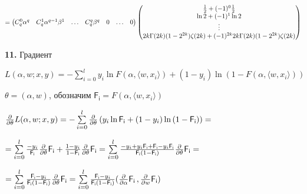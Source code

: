 \documentclass[a4paper,12pt]{article}
\begin{document}
\begin{displaymath}
    = \begin{pmatrix}
        C_q^0 \alpha^q & C_q^1 \alpha^{q - 1} \beta^1 & \ldots & C_q^q \beta^{q} & 0 & \ldots & 0 \\
    \end{pmatrix} \begin{pmatrix}
        {1\over{2}} + (-1)^{0}{1\over{2}} \\ \ln{2} + (-1)^{1}\ln{2} \\ \vdots \\ 2k \Gamma(2k) (1 - 2^{2k}) \zeta(2k) + (-1)^{2k} 2k \Gamma(2k) (1 - 2^{2k}) \zeta(2k)\\
    \end{pmatrix}
\end{displaymath}

\noindent\textbf{11.} Градиент

\begin{center}
    $L(\alpha, w; x, y) = -\sum\limits_{i = 0}^l y_i \ln{F(\alpha, \langle w, x_i\rangle)} + (1 - y_i) \ln{(1 - F(\alpha, \langle w, x_i \rangle))}$
\end{center}

 $\theta = (\alpha, w)$, обозначим $\mathsf{F_i} = F(\alpha, \langle w, x_i\rangle)$

\begin{center}
    ${\partial\over{\partial \theta}} L(\alpha, w; x, y) = -\sum\limits_{i = 0}^l {\partial\over{\partial \theta}} \left( y_i \ln{\mathsf{F_i}} + (1 - y_i) \ln{(1 - \mathsf{F_i})} \right) =$
\end{center}

\begin{center}
    $= \sum\limits_{i = 0}^l {-y_i\over{\mathsf{F_i}}} {\partial\over{\partial \theta}} \mathsf{F_i} + {1 - y_i\over{1 - \mathsf{F_i}}} {\partial\over{\partial \theta}} \mathsf{F_i} = \sum\limits_{i = 0}^l {-y_i + y_i \mathsf{F_i} + \mathsf{F_i} - y_i \mathsf{F_i}\over{\mathsf{F_i} (1 - \mathsf{F_i})}} {\partial\over{\partial \theta}} \mathsf{F_i} =$
\end{center}

\begin{center}
    $= \sum\limits_{i = 0}^l {\mathsf{F_i} -y_i\over{\mathsf{F_i} (1 - \mathsf{F_i})}} {\partial\over{\partial \theta}} \mathsf{F_i} = \sum\limits_{i = 0}^l {\mathsf{F_i} -y_i\over{\mathsf{F_i} (1 - \mathsf{F_i})}} ({\partial\over{\partial \alpha}} \mathsf{F_i}\,, {\partial\over{\partial w}} \mathsf{F_i})$
\end{center}
\end{document}
